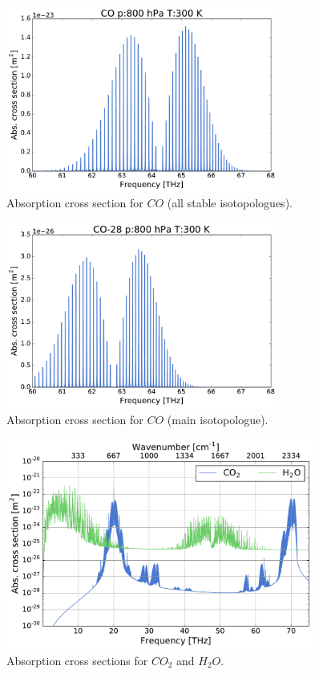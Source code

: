 \documentclass[paper=a4, fontsize=11pt]{scrartcl} %
\begin{document}
\clearpage
\begin{figure}[h!]
  \centering
  \includegraphics[width=0.8\textwidth]{plots/plot_xsec_CO_800hPa_300K.pdf}
  \caption{Absorption cross section for $CO$ (all stable isotopologues).}
  \label{fig:abs_xsec_CO}
\end{figure}
\vfill
\begin{figure}[h!]
  \centering  
  \includegraphics[width=0.8\textwidth]{plots/plot_xsec_CO-28_800hPa_300K.pdf}
  \caption{Absorption cross section for $CO$ (main isotopologue).}
  \label{fig:abs_xsec_CO_main}
\end{figure}

\begin{figure}[ht]
  \includegraphics[angle=90, width=0.9\textwidth]{plots/abs_xsec_overview.pdf}
  \caption{Absorption cross sections for $CO_2$ and $H_2O$.}
  \label{fig:abs_xsec_overview}
\end{figure}
\end{document}
